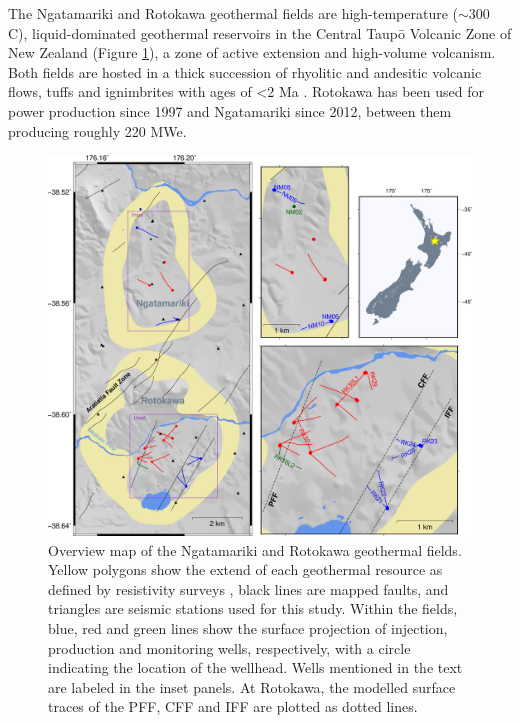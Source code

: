 The Ngatamariki and Rotokawa geothermal fields are high-temperature ($\sim$300\textdegree{} C), liquid-dominated geothermal reservoirs in the Central Taup\={o} Volcanic Zone of New Zealand (Figure \ref{overview_Rot_Nga}), a zone of active extension and high-volume volcanism. Both fields are hosted in a thick succession of rhyolitic and andesitic volcanic flows, tuffs and ignimbrites with ages of \textless{2} Ma \citep{Wilson_1995,Wilson_2016}. Rotokawa has been used for power production since 1997 and Ngatamariki since 2012, between them producing roughly 220 \acrshort{MWe}.

\begin{figure}[h!]
\begin{center}
\includegraphics[width=1.00\columnwidth]{Chapter_5_FMs/figures/RotNga_overview/merc_RotNga_overview_struct}
\caption[Overview of the Ngatamariki and Rotokawa geothermal fields]{{
Overview map of the Ngatamariki and Rotokawa geothermal fields. Yellow polygons show the extend of each geothermal resource as defined by resistivity surveys \citep{Risk_2000,Boseley_2010}, black lines are mapped faults, and triangles are seismic stations used for this study. Within the fields, blue, red and green lines show the surface projection of injection, production and monitoring wells, respectively, with a circle indicating the location of the wellhead. Wells mentioned in the text are labeled in the inset panels. At Rotokawa, the modelled surface traces of the \acrfull{PFF}, \acrfull{CFF} and \acrfull{IFF} are plotted as dotted lines.
{\label{overview_Rot_Nga}}%
}}
\end{center}
\end{figure}

